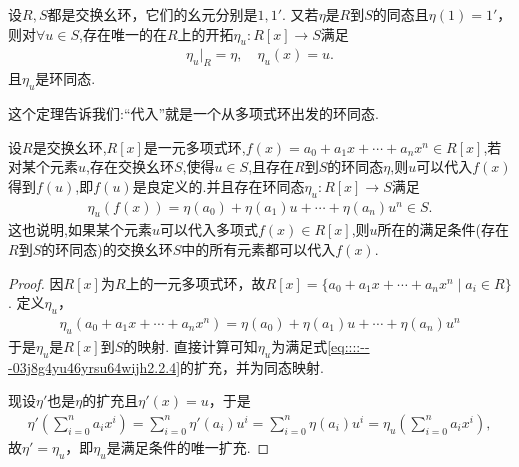\documentclass[../../main.tex]{subfiles}%
\begin{document}
\begin{theorem}\label{theorem:抽象代数--定理2.2.2}
设$R,S$都是交换幺环，它们的幺元分别是$1,1'$. 又若$\eta$是$R$到$S$的同态且$\eta(1)=1'$，则对$\forall u\in S$,存在唯一的在$R$上的开拓$\eta_u:R[x]\to S$满足
\begin{align}\label{eq::::---03j8g4yu46yrsu64wijh2.2.4}
\eta _u|_R=\eta ,\quad \eta _u(x)=u.
\end{align}
且$\eta_u$是环同态.
\end{theorem}
\begin{remark}
这个定理告诉我们:“代入”就是一个从多项式环出发的环同态.

设$R$是交换幺环,$R[x]$是一元多项式环,$f(x) =a_0+a_1x+\cdots +a_nx^n\in R[x]$,若对某个元素$u$,存在交换幺环$S$,使得$u\in S$,且存在$R$到$S$的环同态$\eta$,则$u$可以代入$f(x)$得到$f(u)$,即$f(u)$是良定义的.并且存在环同态$\eta_u:R[x] \rightarrow S$满足
\begin{align*}
\eta_u(f(x)) =\eta(a_0) +\eta(a_1)u+\cdots +\eta(a_n)u^n\in S.
\end{align*}
这也说明,如果某个元素$u$可以代入多项式$f(x) \in R[x]$,则$u$所在的满足条件(存在$R$到$S$的环同态)的交换幺环$S$中的所有元素都可以代入$f(x)$.
\end{remark}
\begin{proof}
因$R[x]$为$R$上的一元多项式环，故$R[x]=\{a_0+a_1x+\cdots+a_nx^n\mid a_i\in R\}$. 定义$\eta_u$，
\begin{align}
\eta_u(a_0+a_1x+\cdots+a_nx^n)=\eta(a_0)+\eta(a_1)u+\cdots+\eta(a_n)u^n\label{eq::::---03j8g4yu46yrsu64wijh2.2.5}
\end{align}
于是$\eta_u$是$R[x]$到$S$的映射. 直接计算可知$\eta_u$为满足式\eqref{eq::::---03j8g4yu46yrsu64wijh2.2.4}的扩充，并为同态映射.

现设$\eta'$也是$\eta$的扩充且$\eta'(x)=u$，于是
\begin{align*}
\eta' \left( \sum_{i=0}^n{a_ix^i} \right) =\sum_{i=0}^n{\eta' (a_i)u^i}=\sum_{i=0}^n{\eta (a_i)u^i}=\eta _u\left( \sum_{i=0}^n{a_ix^i} \right) ,
\end{align*}
故$\eta'=\eta_u$，即$\eta_u$是满足条件的唯一扩充.
\end{proof}
\end{document}
